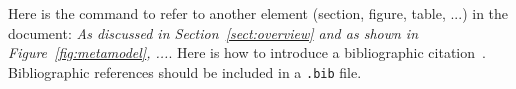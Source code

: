 \RequirePackage[textsize=scriptsize,color=blue!20]{todonotes}
\newcommand{\comment}[2][]{%
\refstepcounter{comment}%
{%
\todo{\textbf{Comment [#1\thecomment]:}~#2}%
}}



Here is the command to refer to another element (section, figure, table, ...) in the document: \emph{As discussed in Section~\ref{sect:overview} and as shown in Figure~\ref{fig:metamodel}, ...}. Here is how to introduce a bibliographic citation~\cite{DAM}. Bibliographic references should be included in a \texttt{.bib} file. 
